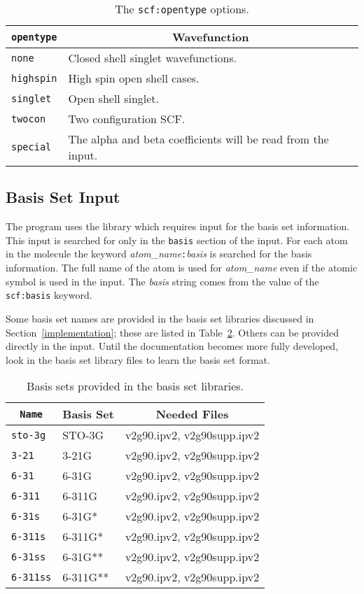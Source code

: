 \begin{table}
\centering
\begin{tabular}{|lp{3.5in}|}
\hline
\multicolumn{1}{|c}{\tt opentype} & \multicolumn{1}{c|}{Wavefunction} \\
\hline
  {\tt none}     & Closed shell singlet wavefunctions. \\
  {\tt highspin} & High spin open shell cases. \\
  {\tt singlet}  & Open shell singlet. \\
  {\tt twocon}   & Two configuration SCF. \\
  {\tt special}  & The alpha and beta coefficients will be read from
                   the input. \\
\hline
\end{tabular}
\caption{The {\tt scf:opentype} options.}
\label{opentypes}
\end{table}

\subsection{Basis Set Input}
The \mpqc{} program uses the \libint{} library which requires input
for the basis set information.
This input is searched for only in the {\tt basis} section of the input.
For each atom in the molecule the keyword
{\it atom\_name}{\tt :}{\it basis} is searched for the basis information.
The full name of the atom is used for {\it atom\_name} even if the
atomic symbol is used in the input.  The {\it basis} string comes from
the value of the {\tt scf:basis} keyword.

Some basis set names are provided in the basis set libraries discussed
in Section~\ref{implementation}; these are listed in Table~\ref{basissets}.
Others can be provided directly in
the input.  Until the documentation becomes more fully developed,
look in the basis set library files to learn the basis set format.


\begin{table}
\centering
\begin{tabular}{|lll|}
\hline
\multicolumn{1}{|c}{\tt Name} & \multicolumn{1}{c}{Basis Set}
                              & \multicolumn{1}{c|}{Needed Files} \\
\hline
{\tt sto-3g}    & STO-3G       & v2g90.ipv2, v2g90supp.ipv2 \\
{\tt 3-21}      & 3-21G        & v2g90.ipv2, v2g90supp.ipv2 \\
{\tt 6-31}      & 6-31G        & v2g90.ipv2, v2g90supp.ipv2 \\
{\tt 6-311}     & 6-311G       & v2g90.ipv2, v2g90supp.ipv2 \\
{\tt 6-31s}     & 6-31G*       & v2g90.ipv2, v2g90supp.ipv2 \\
{\tt 6-311s}    & 6-311G*      & v2g90.ipv2, v2g90supp.ipv2 \\
{\tt 6-31ss}    & 6-31G**      & v2g90.ipv2, v2g90supp.ipv2 \\
{\tt 6-311ss}   & 6-311G**     & v2g90.ipv2, v2g90supp.ipv2 \\
\hline
\end{tabular}
\caption{Basis sets provided in the basis set libraries.}
\label{basissets}
\end{table}


